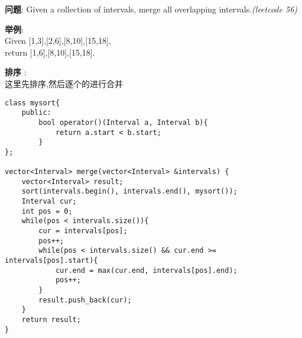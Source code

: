     
\begin{description}
    \item{\textbf{问题}}: Given a collection of intervals, merge all overlapping intervals.\textit{(leetcode 56)}
	\item{\textbf{举例}}:\\
Given [1,3],[2,6],[8,10],[15,18],\\
return [1,6],[8,10],[15,18].
    \item{\textbf{排序}} : 
    \\这里先排序,然后逐个的进行合并
    \begin{lstlisting}
class mysort{
	public:
		bool operator()(Interval a, Interval b){
			return a.start < b.start;
		}
};

vector<Interval> merge(vector<Interval> &intervals) {
	vector<Interval> result;
	sort(intervals.begin(), intervals.end(), mysort());
	Interval cur;
	int pos = 0;
	while(pos < intervals.size()){
		cur = intervals[pos];
		pos++;
		while(pos < intervals.size() && cur.end >= intervals[pos].start){
			cur.end = max(cur.end, intervals[pos].end);
			pos++;
		}
		result.push_back(cur);
	}
	return result;
}
    \end{lstlisting}
\end{description}
